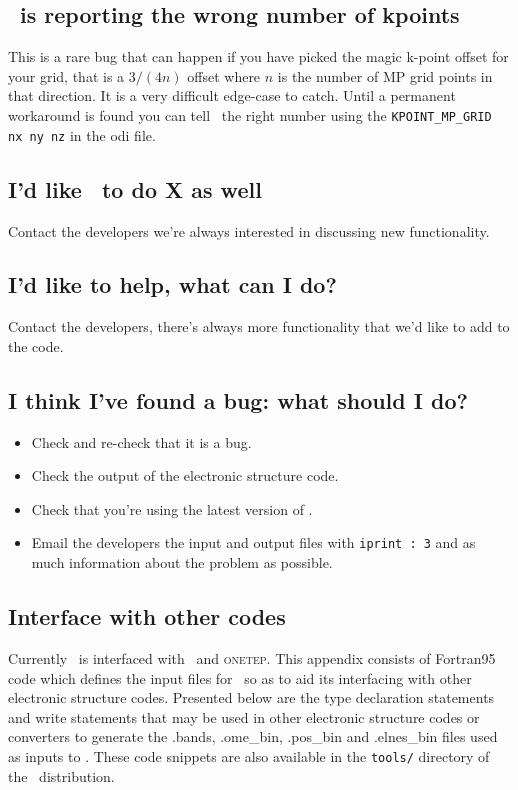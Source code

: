 \documentclass[a4paper,11pt,twoside]{book}
\begin{document}
{\section{\optados\ is reporting the wrong number of kpoints}
This is a rare bug that can happen if you have picked the magic k-point offset for your grid, that is a $3/(4n)$ offset where $n$ is the number of MP grid points in that direction. It is a very difficult edge-case to catch. Until a permanent workaround is found you can tell \optados\ the right number using the \verb#KPOINT_MP_GRID nx ny nz# in the odi file.

\section{I'd like \optados\ to do X as well}
Contact the developers we're always interested in discussing new functionality.

\section{I'd like to help, what can I do?}
Contact the developers, there's always more functionality that we'd
like to add to the code.

\section{I think I've found a bug: what should I do?}
\begin{itemize}
\item Check and re-check that it is a bug.
\item Check the output of the electronic structure code.
\item Check that you're using the latest version of \optados.
\item Email the developers the input and output files with
  \verb#iprint : 3# and as much information about the problem as possible.
\end{itemize}



\begin{appendix}

\chapter{Interface with other codes}
Currently \optados\ is interfaced with \castep\ and \textsc{onetep}.
%
This appendix consists of Fortran95 code which defines the input files for \optados\ so as to aid its interfacing with other electronic structure codes.
%
Presented below are the type declaration statements and write statements that may be used in other electronic structure codes or converters to generate the .bands, .ome\_bin, .pos\_bin and .elnes\_bin files used as inputs to \optados.
%
These code snippets are also available in the \texttt{tools/} directory of the \optados\ distribution.


\end{appendix}}
\end{document}
